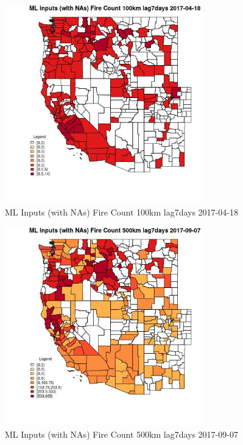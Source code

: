 \begin{figure} 
\centering  
\includegraphics[width=0.77\textwidth]{Code_Outputs/Report_ML_input_PM25_Step4_part_e_de_duplicated_aves_compiled_2019-05-20wNAs_CountyFire_Count_100km_lag7daysMean2017-04-18.jpg} 
\caption{\label{fig:Report_ML_input_PM25_Step4_part_e_de_duplicated_aves_compiled_2019-05-20wNAsCountyFire_Count_100km_lag7daysMean2017-04-18}ML Inputs (with NAs) Fire Count 100km lag7days 2017-04-18} 
\end{figure} 
 

\begin{figure} 
\centering  
\includegraphics[width=0.77\textwidth]{Code_Outputs/Report_ML_input_PM25_Step4_part_e_de_duplicated_aves_compiled_2019-05-20wNAs_CountyFire_Count_500km_lag7daysMean2017-09-07.jpg} 
\caption{\label{fig:Report_ML_input_PM25_Step4_part_e_de_duplicated_aves_compiled_2019-05-20wNAsCountyFire_Count_500km_lag7daysMean2017-09-07}ML Inputs (with NAs) Fire Count 500km lag7days 2017-09-07} 
\end{figure} 
 

